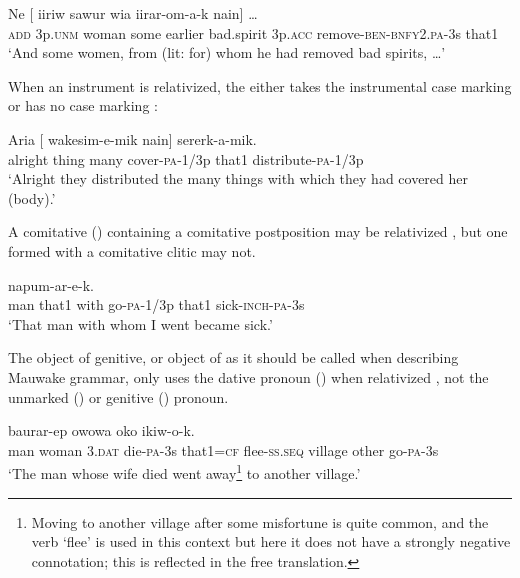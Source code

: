 \ea%
\label{ex:8:x1547}
\gll Ne  [      iiriw  sawur  wia iirar-om-a-k  nain]  {\dots}\\
\textsc{add} 3p.\textsc{unm} woman  some  earlier  bad.spirit 3p.\textsc{acc} remove-\textsc{ben}-\textsc{bnfy}2.\textsc{pa}-3s  that1\\
\glt`And some women, from (lit: for) whom he had removed bad spirits, {\dots}'
\z


When an instrument is relativized, the  either takes the instrumental case marking  or has no case marking : 

\ea%
\label{ex:8:x1553}
\gll Aria  [   wakesim-e-mik  nain]  sererk-a-mik.\\
alright  thing  many  cover-\textsc{pa}-1/3p  that1  distribute-\textsc{pa}-1/3p\\
\glt`Alright they distributed the many things with which they had covered her (body).'
\z


A comitative  () containing a comitative postposition may be relativized , but one formed with a comitative clitic may not. 

\ea%
\label{ex:8:x1542}
  napum-ar-e-k. \\
man  that1  with  go-\textsc{pa}-1/3p  that1 sick-\textsc{inch}-\textsc{pa}-3s\\
\glt`That man with whom I went became sick.'
\z


The object of genitive, or object of  as it should be called when describing Mauwake grammar, only uses the dative pronoun () when relativized , not the unmarked () or genitive () pronoun.

\ea%
\label{ex:8:x1543}
\gll [\textbf{Mua}  emeria  \textbf{wiar}  um-o-k  nain=ke]  baurar-ep owowa  oko  ikiw-o-k.\\
man  woman  3.\textsc{dat}  die-\textsc{pa}-3s that1=\textsc{cf} flee-\textsc{ss}.\textsc{seq} village  other go-\textsc{pa}-3s\\
\glt`The man whose wife died went away\footnote{Moving to another village after some misfortune is quite common, and the verb `flee' is used in this context but here it does not have a strongly negative connotation; this is reflected in the free translation.} to another village.'
\z


